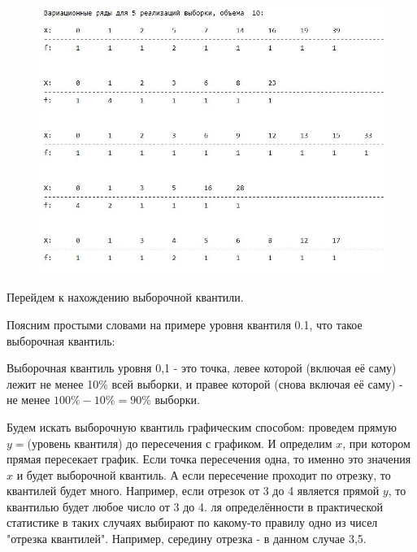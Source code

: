 \documentclass[a4paper,12pt, oneside]{book}
\begin{document}
\begin{figure}[h!]
\begin{center}
		\hfill
	
		\begin{minipage}[h]{0.4\linewidth}
			\includegraphics[width=1.5\linewidth]{var_ser_10.jpg}	
		\end{minipage}

	\end{center}
\end{figure}


\vspace{5mm}



\newpage

	Перейдем к нахождению выборочной квантили.
	
	Поясним простыми словами на примере уровня квантиля  0.1, что такое выборочная квантиль:
	
	\vspace{3mm}
	Выборочная квантиль уровня 0,1 - это точка, левее которой (включая её саму) лежит не менее 10\% всей выборки, и правее которой (снова включая её саму) - не менее $100\%-10\%=90\%$ выборки.
	\vspace{5mm}
	
	 Будем искать выборочную квантиль графическим способом: проведем прямую $y =$(уровень квантиля) до пересечения с графиком. И определим  $x$, при котором прямая пересекает график. Если точка пересечения одна, то именно это значения $x$ и будет выборочной квантиль. А если пересечение проходит по отрезку, то квантилей будет много. Например, если отрезок от 3 до 4 является прямой $y$, то квантилью будет любое число от 3 до 4. ля определённости в практической статистике в таких случаях выбирают по какому-то правилу одно из чисел "отрезка квантилей". Например, середину отрезка - в данном случае 3,5.
	 
\end{document}
